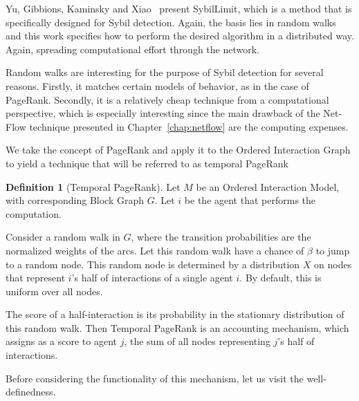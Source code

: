 \documentclass[a4paper,11pt]{book}
\theoremstyle{definition}
\newtheorem{definition}{Definition}
\begin{document}
Yu, Gibbions, Kaminsky and Xiao~\cite{yu2008Sybillimit} present SybilLimit, which
is a method that is specifically designed for Sybil detection. Again, the basis
lies in random walks and this work specifies how to perform the desired
algorithm in a distributed way. Again, spreading computational effort through
the network. 

Random walks are interesting for the purpose of Sybil detection for several reasons.
Firstly, it matches certain models of behavior, as in the case of PageRank. Secondly, it 
is a relatively cheap technique from a computational perspective, which is especially
interesting since the main
drawback of the Net-Flow technique presented in Chapter~\ref{chap:netflow} 
are the computing expenses.

We take the concept of PageRank and apply it to the Ordered Interaction Graph to
yield a technique that will be referred to as temporal PageRank

\begin{definition}[Temporal PageRank]
    Let $M$ be an Ordered Interaction Model, with corresponding Block Graph $G$. 
    Let $i$ be the agent that performs the computation.

    Consider a random walk in $G$, where the transition probabilities are the normalized
    weights of the arcs. Let this random walk have a chance of $\beta$ to jump to a random node.
    This random node is determined by a distribution $X$ on nodes that represent $i$'s half of interactions of
    a single agent $i$. By default, this is uniform over all nodes.

    The score of a half-interaction is its probability in the stationary distribution of this random walk.
    Then Temporal PageRank is an accounting mechanism, which assigns as a score to agent $j$, the
    sum of all nodes representing $j$'s half of interactions.
\end{definition}

Before considering the functionality of this mechanism, let us visit the well-definedness.
\end{document}
